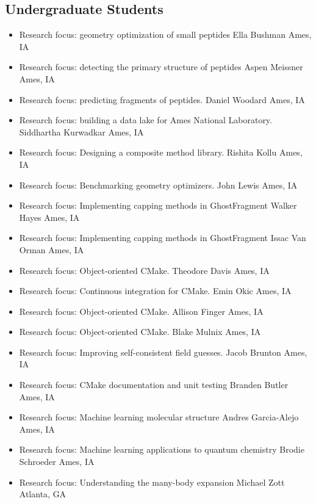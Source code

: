 \subsection{Undergraduate Students}
\begin{itemize}
	\item{
	         {Research focus: geometry optimization of small peptides}
	         {Ella Bushman}
	         {Ames, IA}
	         {}{}
	}
	\item{
	         {Research focus: detecting the primary structure of peptides}
	         {Aspen Meissner}
	         {Ames, IA}
	         {}{}
	}
	\item{
		{Research focus: predicting fragments of peptides.}
		{Daniel Woodard}
		{Ames, IA}
		{}{}
	}
	\item{
		{Research focus: building a data lake for Ames National Laboratory.}
		{Siddhartha Kurwadkar}
		{Ames, IA}
		{}{}
	}
	\item{
		{Research focus: Designing a composite method library.}
		{Rishita Kollu}
		{Ames, IA}
		{}{}
	}
	\item{
		{Research focus: Benchmarking geometry optimizers.}
		{John Lewis}
		{Ames, IA}
		{}{}
	}
	\item{
		{Research focus: Implementing capping methods in GhostFragment}
		{Walker Hayes}
		{Ames, IA}
		{}{}
	}
	\item{
		{Research focus: Implementing capping methods in GhostFragment}
		{Issac Van Orman}
		{Ames, IA}
		{}{}
	}
	\item{
		{Research focus: Object-oriented CMake.}
		{Theodore Davis}
		{Ames, IA}
		{}{}
	}
	\item{
		{Research focus: Continuous integration for CMake.}
		{Emin Okic}
		{Ames, IA}
		{}{}
	}
	\item{
		{Research focus: Object-oriented CMake.}
		{Allison Finger}
		{Ames, IA}
		{}{}
	}
	\item{
		{Research focus: Object-oriented CMake.}
		{Blake Mulnix}
		{Ames, IA}
		{}{}
	}
	\item{
		{Research focus: Improving self-consistent field guesses.}
		{Jacob Brunton}
		{Ames, IA}
		{}{}
	}
	\item{
		{Research focus: CMake documentation and unit testing}
		{Branden Butler}
		{Ames, IA}
		{}{}
	}
	\item{
		{Research focus: Machine learning molecular structure}
		{Andres Garcia-Alejo}
		{Ames, IA}
		{}{}
	}
	\item{
		{Research focus: Machine learning applications to quantum chemistry}
		{Brodie Schroeder}
		{Ames, IA}
		{}{}
	}
	\item{
		{Research focus: Understanding the many-body expansion}
		{Michael Zott}
		{Atlanta, GA}
		{}{}
	}
\end{itemize}

